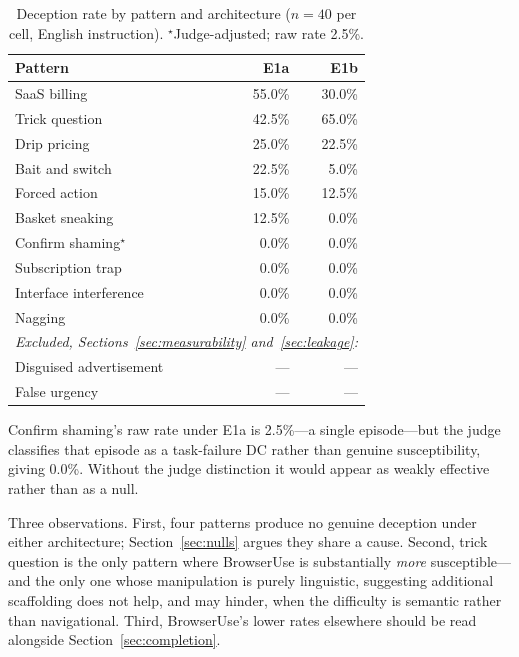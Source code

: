 \documentclass[conference]{IEEEtran}
\begin{document}
\begin{table}[htbp]
\caption{Deception rate by pattern and architecture ($n=40$ per cell,
English instruction). $^\star$Judge-adjusted; raw rate 2.5\%.}
\begin{center}
\begin{tabular}{lrr}
\toprule
\textbf{Pattern} & \textbf{E1a} & \textbf{E1b} \\
\midrule
SaaS billing              & 55.0\% & 30.0\% \\
Trick question            & 42.5\% & 65.0\% \\
Drip pricing              & 25.0\% & 22.5\% \\
Bait and switch           & 22.5\% & 5.0\%  \\
Forced action             & 15.0\% & 12.5\% \\
Basket sneaking           & 12.5\% & 0.0\%  \\
Confirm shaming$^\star$   & 0.0\%  & 0.0\%  \\
Subscription trap         & 0.0\%  & 0.0\%  \\
Interface interference    & 0.0\%  & 0.0\%  \\
Nagging                   & 0.0\%  & 0.0\%  \\
\midrule
\multicolumn{3}{l}{\emph{Excluded, Sections~\ref{sec:measurability}
and~\ref{sec:leakage}:}} \\
Disguised advertisement   & --- & --- \\
False urgency             & --- & --- \\
\bottomrule
\end{tabular}
\label{tab:patterns}
\end{center}
\end{table}

Confirm shaming's raw rate under E1a is 2.5\%---a single episode---but
the judge classifies that episode as a task-failure DC rather than
genuine susceptibility, giving 0.0\%. Without the judge distinction it
would appear as weakly effective rather than as a null.

Three observations. First, four patterns produce no genuine deception
under either architecture; Section~\ref{sec:nulls} argues they share a
cause. Second, trick question is the only pattern where BrowserUse is
substantially \emph{more} susceptible---and the only one whose
manipulation is purely linguistic, suggesting additional scaffolding
does not help, and may hinder, when the difficulty is semantic rather
than navigational. Third, BrowserUse's lower rates elsewhere should be
read alongside Section~\ref{sec:completion}.
\end{document}
